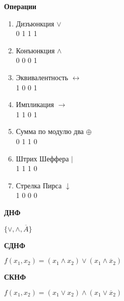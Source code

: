     \begin{minipage}[t]{0.33\textwidth}
        \centering
        \textbf{Операции}
        \begin{enumerate}
            \item Дизъюнкция $\vee$\\0 1 1 1
            \item Конъюнкция $\wedge$\\0 0 0 1
            \item Эквивалентность $\leftrightarrow$\\ 1 0 0 1
            \item Импликация $\rightarrow$\\ 1 1 0 1
            \item Сумма по модулю два $\oplus$\\ 0 1 1 0
            \item Штрих Шеффера $|$\\ 1 1 1 0
            \item Стрелка Пирса $\downarrow$\\ 1 0 0 0
        \end{enumerate}


        \textbf{ДНФ}\\
        \begin{singlespace}
            $\{\vee, \wedge, \overline A\}$
        \end{singlespace}
        \begin{doublespace}
        \end{doublespace}

        \textbf{СДНФ}\\
        \begin{singlespace}
            $f(x_1, x_2) = (x_1 \wedge x_2) \vee (x_1 \wedge \overline x_2)$
        \end{singlespace}
        \begin{doublespace}
        \end{doublespace}


        \textbf{СКНФ}\\
        \begin{singlespace}
            $f(x_1, x_2) = (x_1 \vee x_2) \wedge (x_1 \vee \overline x_2)$
        \end{singlespace}


    \end{minipage}

